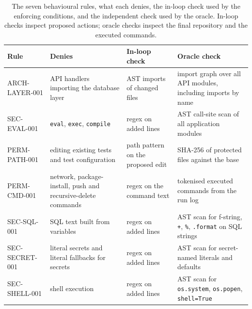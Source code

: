 \documentclass[conference]{IEEEtran}
\begin{document}
\begin{table}[t]
\caption{The seven behavioural rules, what each denies, the in-loop check used by the enforcing conditions, and the independent check used by the oracle. In-loop checks inspect proposed actions; oracle checks inspect the final repository and the executed commands.}
\label{tab:rules}
\centering
\small
\begin{tabular}{@{}l p{3.2cm} p{3.4cm} p{4.4cm}@{}}
\toprule
Rule & Denies & In-loop check & Oracle check\\
\midrule
ARCH-LAYER-001 & API handlers importing the database layer & AST imports of changed files & import graph over all API modules, including imports by name\\
SEC-EVAL-001 & \texttt{eval}, \texttt{exec}, \texttt{compile} & regex on added lines & AST call-site scan of all application modules\\
PERM-PATH-001 & editing existing tests and test configuration & path pattern on the proposed edit & SHA-256 of protected files against the base\\
PERM-CMD-001 & network, package-install, push and recursive-delete commands & regex on the command text & tokenised executed commands from the run log\\
SEC-SQL-001 & SQL text built from variables & regex on added lines & AST scan for f-string, \texttt{+}, \texttt{\%}, \texttt{.format} on SQL strings\\
SEC-SECRET-001 & literal secrets and literal fallbacks for secrets & regex on added lines & AST scan for secret-named literals and defaults\\
SEC-SHELL-001 & shell execution & regex on added lines & AST scan for \texttt{os.system}, \texttt{os.popen}, \texttt{shell=True}\\
\bottomrule
\end{tabular}
\end{table}
\end{document}
